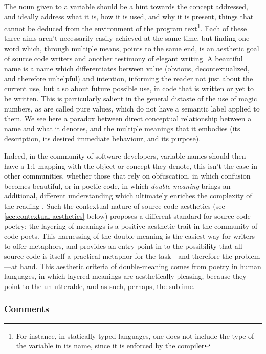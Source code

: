 The noun given to a variable should be a hint towards the concept addressed, and ideally address what it is, how it is used, and why it is present, things that cannot be deduced from the environment of the program text\footnote{For instance, in statically typed languages, one does not include the type of the variable in its name, since it is enforced by the compiler}. Each of these three aims aren't necessarily easily achieved at the same time, but finding one word which, through multiple means, points to the same end, is an aesthetic goal of source code writers and another testimony of elegant writing. A beautiful name is a name which differentiates between value (obvious, decontextualized, and therefore unhelpful) and intention, informing the reader not just about the current use, but also about future possible use, in code that is written or yet to be written. This is particularly salient in the general distaste of the use of magic numbers, as are called pure values, which do not have a semantic label applied to them. We see here a paradox between direct conceptual relationship between a name and what it denotes, and the multiple meanings that it embodies (its description, its desired immediate behaviour, and its purpose).

Indeed, in the community of software developers, variable names should then have a 1:1 mapping with the object or concept they denote, this isn't the case in other communities, whether those that rely on obfuscation, in which confusion becomes beautiful, or in poetic code, in which \emph{double-meaning} brings an additional, different understanding which ultimately enriches the complexity of the reading \citep{knuth_literate_1984}.  Such the contextual nature of source code aesthetics (see \ref{sec:contextual-aesthetics} below) proposes a different standard for source code poetry: the layering of meanings is a positive aesthetic trait in the community of code poets. This harnessing of the double-meaning is the easiest way for writers to offer metaphors, and provides an entry point in to the possibility that all source code is itself a practical metaphor for the task—and therefore the problem—at hand. This aesthetic criteria of double-meaning comes from poetry in human languages, in which layered meanings are aesthetically pleasing, because they point to the un-utterable, and as such, perhaps, the sublime\citep{aquilina_computational_2015}.

\subsubsection{Comments}
\label{subsubsec:framework-comments}

